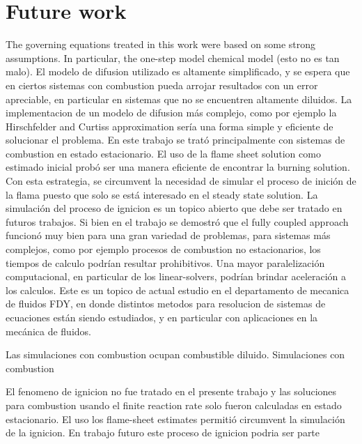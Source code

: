\section{Future work}
The governing equations treated in this work were based on some strong assumptions. In particular, the one-step model chemical model (esto no es tan malo).
El modelo de difusion utilizado es altamente simplificado, y se espera que en ciertos sistemas con combustion pueda arrojar resultados con un error apreciable, en particular en sistemas que no se encuentren altamente diluidos. La implementacion de un modelo de difusion más complejo, como por ejemplo la Hirschfelder and Curtiss approximation sería una forma simple y eficiente de solucionar el problema. 
En este trabajo se trató principalmente con sistemas de combustion en estado estacionario. El uso de la flame sheet solution como estimado inicial probó ser una manera eficiente de encontrar la burning solution. Con esta estrategia, se circumvent la necesidad de simular el proceso de inición de la flama puesto  que solo se está interesado en el steady state solution.  La simulación del proceso de ignicion es un topico abierto que debe ser tratado en futuros trabajos. 
Si bien en el trabajo se demostró que el fully coupled approach funcionó muy bien para una gran variedad de problemas, para sistemas más complejos, como por ejemplo procesos de combustion no estacionarios, los tiempos de calculo podrían resultar prohibitivos. Una mayor paralelización computacional, en particular de los linear-solvers, podrían brindar aceleración a los calculos. Este es un topico de actual estudio en el departamento de mecanica de fluidos FDY, en donde distintos metodos para resolucion de sistemas de ecuaciones están siendo estudiados, y en particular con aplicaciones en la mecánica de fluidos. 

Las simulaciones con combustion ocupan combustible diluido. Simulaciones con combustion     


El fenomeno de ignicion no fue tratado en el presente trabajo y las soluciones para combustion usando el finite reaction rate solo fueron calculadas en estado estacionario. El uso los flame-sheet estimates permitió circumvent la simulación de la ignicion. En trabajo futuro este proceso de ignicion podria ser parte 
